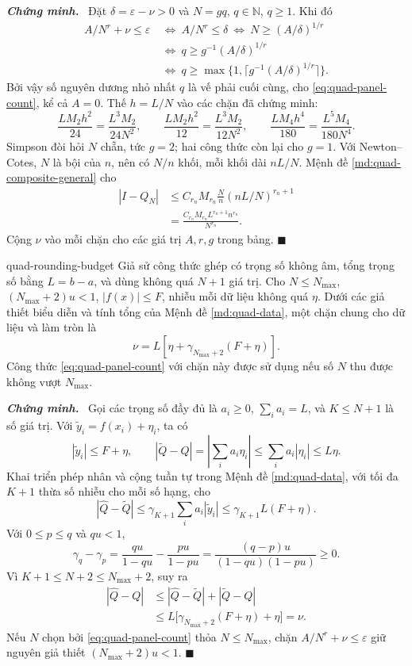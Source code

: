 \documentclass[12pt,a4paper,oneside]{book}
\numberwithin{algorithm}{chapter}
\theoremstyle{definition}
\newenvironment{chungminh}{\par\medskip\noindent\textbf{\textit{\color{mainblue}Chứng minh.}}\ }{\hfill$\blacksquare$\par\medskip}
\begin{document}
\begin{chungminh}
Đặt $\delta=\varepsilon-\nu>0$ và $N=gq$, $q\in\mathbb N$, $q\geq1$. Khi đó
\begin{align*}
 A/N^r+\nu\leq\varepsilon
 &\ \Longleftrightarrow\ A/N^r\leq\delta
 \ \Longleftrightarrow\ N\geq(A/\delta)^{1/r}\\
 &\ \Longleftrightarrow\ q\geq g^{-1}(A/\delta)^{1/r}\\
 &\ \Longleftrightarrow\ q\geq
 \max\{1,\lceil g^{-1}(A/\delta)^{1/r}\rceil\}.
\end{align*}
Bởi vậy số nguyên dương nhỏ nhất $q$ là vế phải cuối cùng, cho \eqref{eq:quad-panel-count}, kể cả $A=0$. Thế $h=L/N$ vào các chặn đã chứng minh:
\[
 \frac{LM_2h^2}{24}=\frac{L^3M_2}{24N^2},\qquad
 \frac{LM_2h^2}{12}=\frac{L^3M_2}{12N^2},\qquad
 \frac{LM_4h^4}{180}=\frac{L^5M_4}{180N^4}.
\]
Simpson đòi hỏi $N$ chẵn, tức $g=2$; hai công thức còn lại cho $g=1$. Với Newton--Cotes, $N$ là bội của $n$, nên có $N/n$ khối, mỗi khối dài $nL/N$. Mệnh đề \ref{md:quad-composite-general} cho
\begin{align*}
 |I-Q_N|
 &\leq C_{r_n}M_{r_n}\frac Nn(nL/N)^{r_n+1}\\
 &=\frac{C_{r_n}M_{r_n}L^{r_n+1}n^{r_n}}{N^{r_n}}.
\end{align*}
Cộng $\nu$ vào mỗi chặn cho các giá trị $A,r,g$ trong bảng.
\end{chungminh}

\begin{menhde}{}{quad-rounding-budget}
Giả sử công thức ghép có trọng số không âm, tổng trọng số bằng $L=b-a$, và dùng không quá $N+1$ giá trị. Cho $N\leq N_{\max}$, $(N_{\max}+2)u<1$, $|f(x)|\leq F$, nhiễu mỗi dữ liệu không quá $\eta$. Dưới các giả thiết biểu diễn và tính tổng của Mệnh đề \ref{md:quad-data}, một chặn chung cho dữ liệu và làm tròn là
\[
 \nu=L\left[\eta+\gamma_{N_{\max}+2}(F+\eta)\right].
\]
Công thức \eqref{eq:quad-panel-count} với chặn này được sử dụng nếu số $N$ thu được không vượt $N_{\max}$.
\end{menhde}
\begin{chungminh}
Gọi các trọng số đầy đủ là $a_i\geq0$, $\sum_i a_i=L$, và $K\leq N+1$ là số giá trị. Với $\widetilde y_i=f(x_i)+\eta_i$, ta có
\[
 |\widetilde y_i|\leq F+\eta,\qquad
 |\widetilde Q-Q|=\left|\sum_i a_i\eta_i\right|
 \leq\sum_i a_i|\eta_i|\leq L\eta.
\]
Khai triển phép nhân và cộng tuần tự trong Mệnh đề \ref{md:quad-data}, với tối đa $K+1$ thừa số nhiễu cho mỗi số hạng, cho
\[
 |\widehat Q-\widetilde Q|
 \leq\gamma_{K+1}\sum_i a_i|\widetilde y_i|
 \leq\gamma_{K+1}L(F+\eta).
\]
Với $0\leq p\leq q$ và $qu<1$,
\[
 \gamma_q-\gamma_p
 =\frac{qu}{1-qu}-\frac{pu}{1-pu}
 =\frac{(q-p)u}{(1-qu)(1-pu)}\geq0.
\]
Vì $K+1\leq N+2\leq N_{\max}+2$, suy ra
\begin{align*}
 |\widehat Q-Q|
 &\leq|\widehat Q-\widetilde Q|+|\widetilde Q-Q|\\
 &\leq L\bigl[\gamma_{N_{\max}+2}(F+\eta)+\eta\bigr]=\nu.
\end{align*}
Nếu $N$ chọn bởi \eqref{eq:quad-panel-count} thỏa $N\leq N_{\max}$, chặn $A/N^r+\nu\leq\varepsilon$ giữ nguyên giả thiết $(N_{\max}+2)u<1$.
\end{chungminh}
\end{document}
